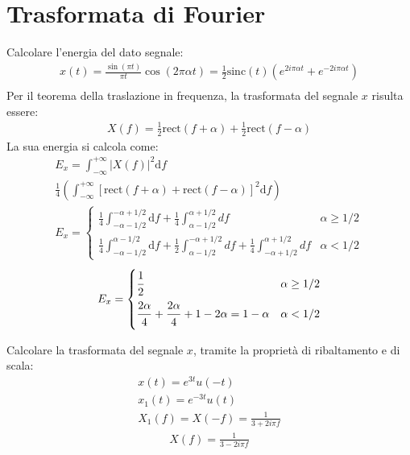 \documentclass{article}
\newcommand{\rect}{\mathrm{rect}}
\newcommand{\sinc}{\mathrm{sinc}}
\newcommand{\df}{\mathrm{d}}
\begin{document}
\clearpage

\section{Trasformata di Fourier}
Calcolare l'energia del dato segnale:
\begin{gather*}
    x(t)=\displaystyle\frac{\sin(\pi t)}{\pi t}\cos(2\pi \alpha t)=\frac{1}{2}\sinc(t)(e^{2i\pi\alpha t}+e^{-2i\pi\alpha t})\\
\end{gather*}
Per il teorema della traslazione in frequenza, la trasformata del segnale $x$ risulta essere:
\begin{gather*}
    X(f)=\displaystyle\frac{1}{2}\rect(f+\alpha)+\frac{1}{2}\rect(f-\alpha)
\end{gather*}
La sua energia si calcola come:
\begin{gather*}
    E_x=\displaystyle\int_{-\infty}^{+\infty}|X(f)|^2\df f\\
    \displaystyle\frac{1}{4}\left(\int_{-\infty}^{+\infty}\left[\rect(f+\alpha)+\rect(f-\alpha)\right]^2\df f\right)\\
    E_x=\begin{cases}
        \displaystyle\frac{1}{4}\int_{-\alpha-1/2}^{-\alpha+1/2}\df f+\frac{1}{4}\int_{\alpha-1/2}^{\alpha+1/2}df& \alpha\geq1/2\\
        \displaystyle\frac{1}{4}\int_{-\alpha-1/2}^{\alpha-1/2}\df f+\frac{1}{2}\int_{\alpha-1/2}^{-\alpha+1/2}df+\frac{1}{4}\int_{-\alpha+1/2}^{\alpha+1/2}df&\alpha<1/2
    \end{cases}
\end{gather*}
\begin{gather}
    E_x=\begin{cases}
        \displaystyle\frac{\strut 1}{\strut 2}&\alpha\geq1/2\\
        \displaystyle\frac{\strut 2\alpha}{\strut 4}+\frac{\strut 2\alpha}{\strut 4}+1-2\alpha=1-\alpha&\alpha<1/2
    \end{cases}
\end{gather}


Calcolare la trasformata del segnale $x$, tramite la proprietà di ribaltamento e di scala: 
\begin{gather*}
    x(t)=e^{3t}u(-t)\\
    x_1(t)=e^{-3t}u(t)\\
    X_1(f)=X(-f)=\displaystyle\frac{1}{3+2i\pi f}
\end{gather*}
\begin{gather}
    X(f)=\displaystyle\frac{1}{3-2i\pi f}
\end{gather}
\end{document}
